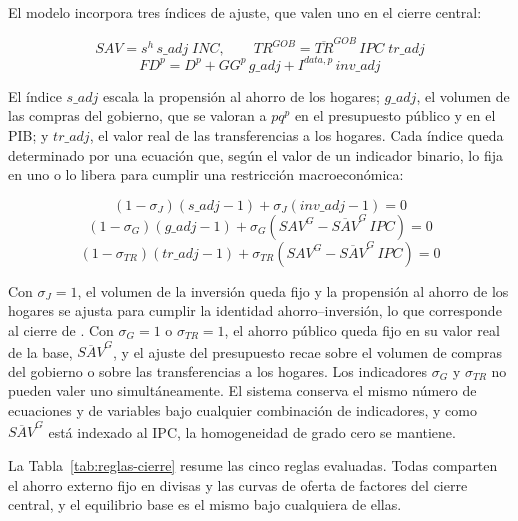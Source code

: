 \documentclass[11pt]{article}
\begin{document}
El modelo incorpora tres índices de ajuste, que valen uno en el cierre central:

\[
SAV=s^{h}\,s\_adj\;INC,
\qquad
TR^{GOB}=\overline{TR}^{GOB}\,IPC\;tr\_adj
\]
\[
FD^{p}=D^{p}+GG^{p}\,g\_adj+I^{data,p}\,inv\_adj
\]

El índice $s\_adj$ escala la propensión al ahorro de los hogares; $g\_adj$, el volumen de las compras del gobierno, que se valoran a $pq^{p}$ en el presupuesto público y en el PIB; y $tr\_adj$, el valor real de las transferencias a los hogares. Cada índice queda determinado por una ecuación que, según el valor de un indicador binario, lo fija en uno o lo libera para cumplir una restricción macroeconómica:

\[
\left(1-\sigma_{J}\right)\left(s\_adj-1\right)+\sigma_{J}\left(inv\_adj-1\right)=0
\]
\[
\left(1-\sigma_{G}\right)\left(g\_adj-1\right)+\sigma_{G}\left(SAV^{G}-\overline{SAV}^{G}\,IPC\right)=0
\]
\[
\left(1-\sigma_{TR}\right)\left(tr\_adj-1\right)+\sigma_{TR}\left(SAV^{G}-\overline{SAV}^{G}\,IPC\right)=0
\]

Con $\sigma_{J}=1$, el volumen de la inversión queda fijo y la propensión al ahorro de los hogares se ajusta para cumplir la identidad ahorro--inversión, lo que corresponde al cierre de \cite{johansen_1960}. Con $\sigma_{G}=1$ o $\sigma_{TR}=1$, el ahorro público queda fijo en su valor real de la base, $\overline{SAV}^{G}$, y el ajuste del presupuesto recae sobre el volumen de compras del gobierno o sobre las transferencias a los hogares. Los indicadores $\sigma_{G}$ y $\sigma_{TR}$ no pueden valer uno simultáneamente. El sistema conserva el mismo número de ecuaciones y de variables bajo cualquier combinación de indicadores, y como $\overline{SAV}^{G}$ está indexado al IPC, la homogeneidad de grado cero se mantiene.

La Tabla~\ref{tab:reglas-cierre} resume las cinco reglas evaluadas. Todas comparten el ahorro externo fijo en divisas y las curvas de oferta de factores del cierre central, y el equilibrio base es el mismo bajo cualquiera de ellas.
\end{document}
